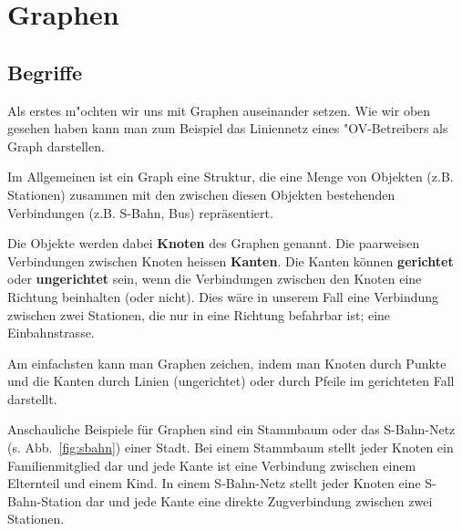 \section{Graphen}




\subsection{Begriffe}

Als erstes m"ochten wir uns mit Graphen auseinander setzen. 
Wie wir oben gesehen haben kann man zum Beispiel das Liniennetz eines "OV-Betreibers als Graph darstellen. 


Im Allgemeinen ist ein Graph eine Struktur, die eine Menge von Objekten (z.B. Stationen) zusammen mit den zwischen diesen Objekten bestehenden Verbindungen (z.B. S-Bahn, Bus) repräsentiert. 

Die Objekte werden dabei \textbf{Knoten} des Graphen genannt. 
Die paarweisen Verbindungen zwischen Knoten heissen \textbf{Kanten}. 
Die Kanten können \textbf{gerichtet} oder \textbf{ungerichtet} sein, wenn die Verbindungen zwischen den Knoten eine Richtung beinhalten (oder nicht).
Dies wäre in unserem Fall eine Verbindung zwischen zwei Stationen, die nur in eine Richtung befahrbar ist; eine Einbahnstrasse.

Am einfachsten kann man Graphen zeichen, indem man Knoten durch Punkte und die Kanten durch Linien (ungerichtet) oder durch Pfeile im gerichteten Fall darstellt. 

\begin{mbsp}
Anschauliche Beispiele für Graphen sind ein Stammbaum oder das S-Bahn-Netz (s. Abb.~\ref{fig:sbahn}) einer Stadt. 
Bei einem Stammbaum stellt jeder Knoten ein Familienmitglied dar und jede Kante ist eine Verbindung zwischen einem Elternteil und einem Kind. 
In einem S-Bahn-Netz stellt jeder Knoten eine S-Bahn-Station dar und jede Kante eine direkte Zugverbindung zwischen zwei Stationen.
\end{mbsp}
%
%

